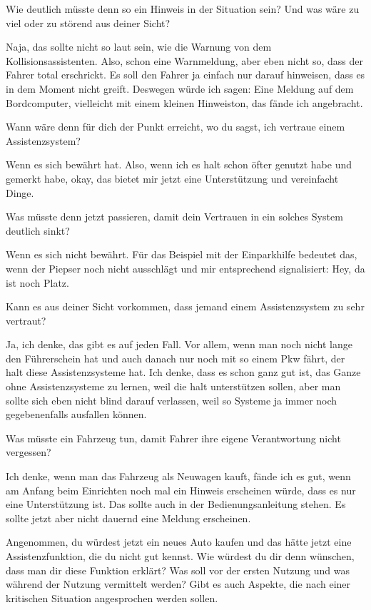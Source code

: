 \interviewerin
Wie deutlich müsste denn so ein Hinweis in der Situation sein? Und was
wäre zu viel oder zu störend aus deiner Sicht?

Naja, das sollte nicht so laut sein, wie die Warnung von dem
Kollisionsassistenten. Also, schon eine Warnmeldung, aber eben nicht so,
dass der Fahrer total erschrickt. Es soll den Fahrer ja einfach nur
darauf hinweisen, dass es in dem Moment nicht greift. Deswegen würde ich
sagen: Eine Meldung auf dem Bordcomputer, vielleicht mit einem kleinen
Hinweiston, das fände ich angebracht.

\interviewerin
Wann wäre denn für dich der Punkt erreicht, wo du sagst, ich vertraue
einem Assistenzsystem?

Wenn es sich bewährt hat. Also, wenn ich es halt schon öfter genutzt
habe und gemerkt habe, okay, das bietet mir jetzt eine Unterstützung und
vereinfacht Dinge.

\interviewerin
Was müsste denn jetzt passieren, damit dein Vertrauen in ein solches
System deutlich sinkt?

Wenn es sich nicht bewährt. Für das Beispiel mit der Einparkhilfe
bedeutet das, wenn der Piepser noch nicht ausschlägt und mir
entsprechend signalisiert: Hey, da ist noch Platz.

\interviewerin
Kann es aus deiner Sicht vorkommen, dass jemand einem Assistenzsystem zu
sehr vertraut?

Ja, ich denke, das gibt es auf jeden Fall. Vor allem, wenn man noch
nicht lange den Führerschein hat und auch danach nur noch mit so einem
Pkw fährt, der halt diese Assistenzsysteme hat. Ich denke, dass es schon
ganz gut ist, das Ganze ohne Assistenzsysteme zu lernen, weil die halt
unterstützen sollen, aber man sollte sich eben nicht blind darauf
verlassen, weil so Systeme ja immer noch gegebenenfalls ausfallen
können.

\interviewerin
Was müsste ein Fahrzeug tun, damit Fahrer ihre eigene Verantwortung
nicht vergessen?

Ich denke, wenn man das Fahrzeug als Neuwagen kauft, fände ich es gut,
wenn am Anfang beim Einrichten noch mal ein Hinweis erscheinen würde,
dass es nur eine Unterstützung ist. Das sollte auch in der
Bedienungsanleitung stehen. Es sollte jetzt aber nicht dauernd eine
Meldung erscheinen.

\interviewerin
Angenommen, du würdest jetzt ein neues Auto kaufen und das hätte jetzt
eine Assistenzfunktion, die du nicht gut kennst. Wie würdest du dir denn
wünschen, dass man dir diese Funktion erklärt? Was soll vor der ersten
Nutzung und was während der Nutzung vermittelt werden? Gibt es auch
Aspekte, die nach einer kritischen Situation angesprochen werden sollen.

